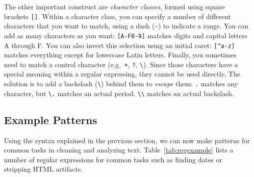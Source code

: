 The other important construct are \emph{character classes}, formed using square brackets \verb|[]|.
Within a character class, you can specify a number of different characters that you want to match, using a dash (\verb|-|) to indicate a range.
You can add as many characters as you want: \verb|[A-F0-9]| matches digits and capital letters A through F.
You can also invert this selection using an initial caret: \verb|[^a-z]| matches everything except for lowercase Latin letters.
Finally, you sometimes need to match a control character  (e.g.\ \verb|+|, \verb|?|, \verb|\|). Since those characters have a special meaning within a regular expressing, they cannot be used directly. The solution is to add a backslash (\verb|\|) behind them to \emph{escape} them:
\verb|.| matches any character, but \verb|\.| matches an actual period. \verb|\\| matches an actual backslash.

\subsection{Example Patterns}

Using the syntax explained in the previous section, we can now make patterns for common tasks in cleaning and analyzing text.
Table~\ref{tab:regexample} lists a number of regular expressions for common tasks such as finding dates or stripping HTML artifacts.

%


